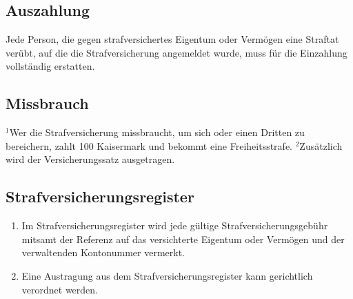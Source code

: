 \documentclass{article}
\begin{document}
\subsection{Auszahlung}
Jede Person, die gegen strafversichertes Eigentum oder Vermögen eine Straftat verübt, auf die die Strafversicherung angemeldet wurde, muss für die Einzahlung vollständig erstatten.

\subsection{Missbrauch}
${^1}$Wer die Strafversicherung missbraucht, um sich oder einen Dritten zu bereichern, zahlt 100 Kaisermark und bekommt eine Freiheitsstrafe. ${^2}$Zusätzlich wird der Versicherungssatz ausgetragen.

\subsection{Strafversicherungsregister}
\begin{enumerate}[(1)]
    \item Im Strafversicherungsregister wird jede gültige Strafversicherungsgebühr mitsamt der Referenz auf das versichterte Eigentum oder Vermögen und der verwaltenden Kontonummer vermerkt.
    \item Eine Austragung aus dem Strafversicherungsregister kann gerichtlich verordnet werden.
\end{enumerate}
\end{document}
